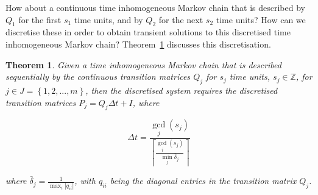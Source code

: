 \documentclass{article}
\newtheorem{theorem}{Theorem}
\begin{document}
How about a continuous time inhomogeneous Markov chain that is described by $Q_1$ for the first $s_1$ time units, and by $Q_2$ for the next $s_2$ time units?
How can we discretise these in order to obtain transient solutions to this discretised time inhomogeneous Markov chain?
Theorem~\ref{thrm:discretisetimeinhomogeneousmarkovchains} discusses this discretisation.
\newline

\begin{theorem}\label{thrm:discretisetimeinhomogeneousmarkovchains}
Given a time inhomogeneous Markov chain that is described sequentially by the continuous transition matrices $Q_j$ for $s_j$ time units, $s_j \in \mathbb{Z}$, for $j \in J = \left\{ 1, 2, ..., m \right\}$, then the discretised system requires the discretised transition matrices $P_j = Q_j \Delta t + I$, where

$$
\Delta t = \frac{\gcd_j(s_j)}{\left\lceil \frac{\gcd_j(s_j)}{\min_j \bar{\delta}_j} \right\rceil}
$$

where $\bar{\delta}_j = \frac{1}{\max_i |q_{ii}|}$, with $q_{ii}$ being the diagonal entries in the transition matrix $Q_j$.
\end{theorem}
\end{document}
